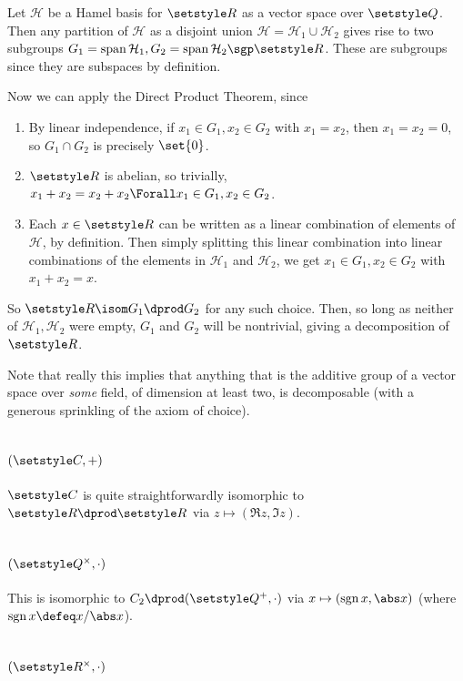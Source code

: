\documentclass[fleqn,a4paper,11pt]{article}
\begin{document}
Let \(\mathcal H\) be a Hamel basis for \(\R\) as a vector space over \(\Q\).
Then any partition of \(\mathcal H\) as a disjoint union
\(\mathcal H = \mathcal H_1 \cup \mathcal H_2\) gives rise to two subgroups
\(G_1 = \vspan \mathcal H_1, G_2 = \vspan \mathcal H_2 \sgp \R\). These are
subgroups since they are subspaces by definition.

Now we can apply the Direct Product Theorem, since
\begin{enumerate}[label=(\roman*)]
 \item
  By linear independence, if \(x_1 \in G_1, x_2 \in G_2\) with \(x_1 = x_2\),
  then \(x_1 = x_2 = 0\), so \(G_1 \cap G_2\) is precisely \(\set{0}\).
 \item
  \(\R\) is abelian, so trivially,
  \(x_1 + x_2 = x_2 + x_2 \Forall x_1 \in G_1, x_2 \in G_2\).
 \item
  Each \(x \in \R\) can be written as a linear combination of elements of
  \(\mathcal H\), by definition. Then simply splitting this linear combination
  into linear combinations of the elements in \(\mathcal H_1\) and
  \(\mathcal H_2\), we get \(x_1 \in G_1, x_2 \in G_2\) with \(x_1 + x_2 = x\).
\end{enumerate}
So \(\R \isom G_1 \dprod G_2\) for any such choice. Then, so long as neither of
\(\mathcal H_1, \mathcal H_2\) were empty, \(G_1\) and \(G_2\) will be
nontrivial, giving a decomposition of \(\R\).

Note that really this implies that anything that is the additive group of a
vector space over \emph{some} field, of dimension at least two, is decomposable
(with a generous sprinkling of the axiom of choice).

\section{\((\CC, +)\)}

\(\CC\) is quite straightforwardly isomorphic to \(\R \dprod \R\) via \(z
\mapsto (\Re z, \Im z)\).

\section{\((\Q^\times, \cdot)\)}

This is isomorphic to \(C_2 \dprod (\Q^+, \cdot)\) via
\(x \mapsto (\sgn x, \abs x)\) (where \(\sgn x \defeq x/\abs x\)).

\section{\((\R^\times, \cdot)\)}
\end{document}
